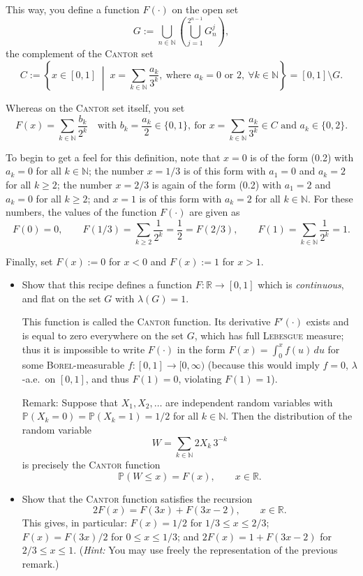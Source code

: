 \documentclass[letterpaper]{article}
\begin{document}
		This way, you define a function $F(\cdot)$ on the open set
		\[
		G := \bigcup_{n\in\mathbb{N}}
		\left( \bigcup_{j=1}^{2^{n-1}} G_n^j \right), \tag{0.1}
		\]
		the complement of the \textsc{Cantor} set
		\[
		C := \left\{ x \in [0,1] \;\middle|\;
		x = \sum_{k\in\mathbb{N}} \frac{a_k}{3^k},
		\ \text{where } a_k = 0 \text{ or } 2,\ \forall k \in \mathbb{N}
		\right\}
		= [0,1]\setminus G. \tag{0.2}
		\]
		
		Whereas on the \textsc{Cantor} set itself, you set
		\[
		F(x) = \sum_{k\in\mathbb{N}} \frac{b_k}{2^k}
		\quad \text{with } b_k = \frac{a_k}{2} \in \{0,1\},
		\ \text{for } x = \sum_{k\in\mathbb{N}} \frac{a_k}{3^k} \in C
		\text{ and } a_k \in \{0,2\}. \tag{0.3}
		\]
		
		To begin to get a feel for this definition, note that
		$x=0$ is of the form (0.2) with $a_k=0$ for all $k\in\mathbb{N}$;
		the number $x=1/3$ is of this form with $a_1=0$ and
		$a_k=2$ for all $k\ge 2$;
		the number $x=2/3$ is again of the form (0.2) with $a_1=2$
		and $a_k=0$ for all $k\ge 2$;
		and $x=1$ is of this form with $a_k=2$ for all $k\in\mathbb{N}$.
		For these numbers, the values of the function $F(\cdot)$ are given as
		\[
		F(0)=0, \qquad
		F(1/3)=\sum_{k\ge 2}\frac{1}{2^k}=\frac12=F(2/3),
		\qquad
		F(1)=\sum_{k\in\mathbb{N}}\frac{1}{2^k}=1.
		\]
		
		Finally, set $F(x):=0$ for $x<0$ and $F(x):=1$ for $x>1$.
		
		\begin{itemize}
			\item[(i)] Show that this recipe defines a function
			$F:\mathbb{R}\to[0,1]$ which is \textit{continuous}, and flat on the
			set $G$ with $\lambda(G)=1$.
		
		
			{\footnotesize\color{Gray}  This function is called the \textsc{Cantor} function. Its derivative
				$F'(\cdot)$ exists and is equal to zero everywhere on the set $G$, which has full
				\textsc{Lebesgue} measure; thus it is impossible to write $F(\cdot)$ in the form
				$F(x)=\int_0^x f(u)\,du$ for some \textsc{Borel}-measurable $f:[0,1]\to[0,\infty)$
				(because this would imply $f=0$, $\lambda$-a.e.\ on $[0,1]$, and thus $F(1)=0$,
				violating $F(1)=1$).
			
			
			{Remark:} Suppose that $X_1,X_2,\ldots$ are independent random variables with
			$\mathbb{P}(X_k=0)=\mathbb{P}(X_k=1)=1/2$ for all $k\in\mathbb{N}$. Then the
			distribution of the random variable
			\[
			W=\sum_{k\in\mathbb{N}} 2X_k\,3^{-k}
			\]
			is precisely the \textsc{Cantor} function
			\[
			\mathbb{P}(W\le x)=F(x), \qquad x\in\mathbb{R}.
			\]
		}
			\item[(ii)] Show that the \textsc{Cantor} function satisfies the recursion
			\[
			2F(x)=F(3x)+F(3x-2), \qquad x\in\mathbb{R}.
			\]
			This gives, in particular: $F(x)=1/2$ for $1/3 \le x \le 2/3$;
			$F(x)=F(3x)/2$ for $0 \le x \le 1/3$; and $2F(x)=1+F(3x-2)$ for $2/3 \le x \le 1$.
			(\textit{Hint:} You may use freely the representation of the previous remark.)
		\end{itemize}
		
\end{document}
